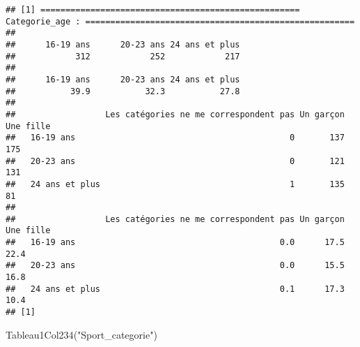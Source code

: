 \documentclass[
]{article}
\newenvironment{Shaded}{\begin{snugshade}}{\end{snugshade}}
\newcommand{\FunctionTok}[1]{\textcolor[rgb]{0.00,0.00,0.00}{#1}}
\newcommand{\NormalTok}[1]{#1}
\newcommand{\StringTok}[1]{\textcolor[rgb]{0.31,0.60,0.02}{#1}}
\begin{document}
\begin{verbatim}
## [1] ==================================================== Categorie_age : ======================================================
## 
##      16-19 ans      20-23 ans 24 ans et plus 
##            312            252            217 
## 
##      16-19 ans      20-23 ans 24 ans et plus 
##           39.9           32.3           27.8 
##                 
##                  Les catégories ne me correspondent pas Un garçon Une fille
##   16-19 ans                                           0       137       175
##   20-23 ans                                           0       121       131
##   24 ans et plus                                      1       135        81
##                 
##                  Les catégories ne me correspondent pas Un garçon Une fille
##   16-19 ans                                         0.0      17.5      22.4
##   20-23 ans                                         0.0      15.5      16.8
##   24 ans et plus                                    0.1      17.3      10.4
## [1]
\end{verbatim}

\begin{Shaded}
\begin{Highlighting}[]
\FunctionTok{Tableau1Col234}\NormalTok{(}\StringTok{"Sport\_categorie"}\NormalTok{)}
\end{Highlighting}
\end{Shaded}
\end{document}
